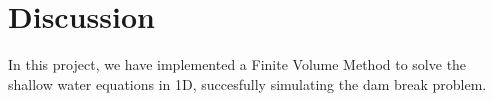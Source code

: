 \chapter{Discussion}
In this project, we have implemented a Finite Volume Method to solve the shallow water equations in 1D, succesfully simulating the dam break problem.



